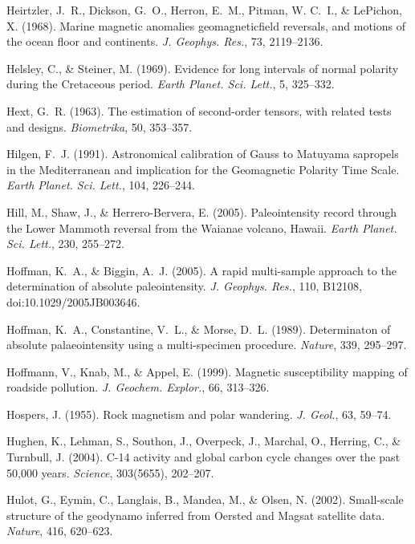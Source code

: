 \documentclass[,plain]{tauxe}
\begin{document}
\begin{thebibliography}{}
\bibitem{}%
Heirtzler, J.~R., Dickson, G.~O., Herron, E.~M., Pitman, W. C.~I., \& LePichon, X. (1968).
Marine magnetic anomalies geomagnetic\break field reversals, and motions of the ocean floor and continents.
{\it J. Geophys. Res.}, 73, 2119--2136.

\bibitem{}%
Helsley, C., \& Steiner, M. (1969).
Evidence for long intervals of normal polarity during the Cretaceous period.
{\it Earth Planet. Sci. Lett.}, 5, 325--332.

\bibitem{}%
Hext, G.~R. (1963).
The estimation of second-order tensors, with related tests and designs.
{\it Biometrika}, 50, 353--357.

\bibitem{}%
Hilgen, F.~J. (1991).
Astronomical calibration of Gauss to Matuyama sapropels in the Mediterranean and implication for the Geomagnetic Polarity Time Scale.
{\it Earth Planet. Sci. Lett.}, 104, 226--244.

\bibitem{}%
Hill, M., Shaw, J., \& Herrero-Bervera, E. (2005).
Paleointensity record through the Lower Mammoth reversal from the Waianae volcano, Hawaii.
{\it Earth Planet. Sci. Lett.}, 230, 255--272.

\bibitem{}%
Hoffman, K.~A., \& Biggin, A.~J. (2005).
A rapid multi-sample approach to the determination of absolute paleointensity.
{\it J. Geophys. Res.}, 110, B12108, doi:10.1029/2005JB003646.

\bibitem{}%
Hoffman, K.~A., Constantine, V.~L., \& Morse, D.~L. (1989).
Determinaton of absolute palaeointensity using a multi-specimen procedure.
{\it Nature}, 339, 295--297.

\bibitem{}%
Hoffmann, V., Knab, M., \& Appel, E. (1999).
Magnetic susceptibility mapping of roadside pollution.
{\it J. Geochem. Explor.}, 66, 313--326.

\bibitem{}%
Hospers, J. (1955).
Rock magnetism and polar wandering.
{\it J. Geol.}, 63, 59--74.

\bibitem{}%
Hughen, K., Lehman, S., Southon, J., Overpeck, J., Marchal, O., Herring, C., \& Turnbull, J. (2004).
C-14 activity and global carbon cycle changes over the past 50,000 years.
{\it Science}, 303(5655), 202--207.

\bibitem{}%
Hulot, G., Eymin, C., Langlais, B., Mandea, M., \& Olsen, N. (2002).
Small-scale structure of the geodynamo inferred from Oersted and Magsat satellite data.
{\it Nature}, 416, 620--623.


\end{thebibliography}
\end{document}
